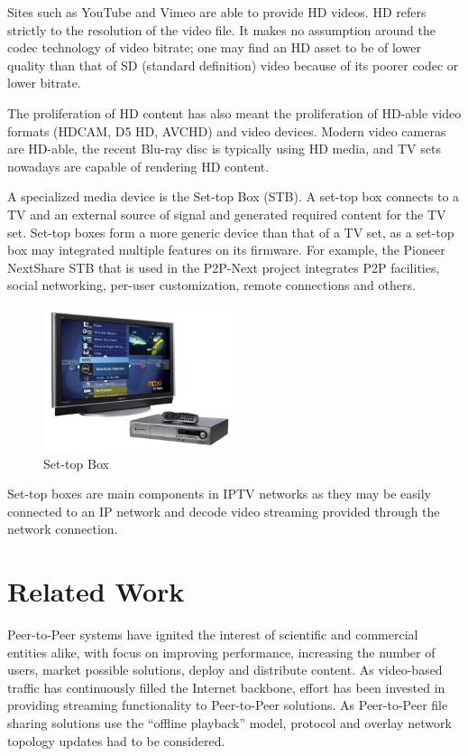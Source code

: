 Sites such as YouTube and Vimeo are able to provide HD videos. HD refers
strictly to the resolution of the video file. It makes no assumption around
the codec technology of video bitrate; one may find an HD asset to be of lower
quality than that of SD (standard definition) video because of its poorer
codec or lower bitrate.

The proliferation of HD content has also meant the proliferation of HD-able
video formats (HDCAM, D5 HD, AVCHD) and video devices. Modern video cameras
are HD-able, the recent Blu-ray disc is typically using HD media, and TV sets
nowadays are capable of rendering HD content.

A specialized media device is the Set-top Box (STB). A set-top box connects to
a TV and an external source of signal and generated required content for the
TV set. Set-top boxes form a more generic device than that of a TV set, as a
set-top box may integrated multiple features on its firmware. For example, the
Pioneer NextShare STB that is used in the P2P-Next project integrates P2P
facilities, social networking, per-user customization, remote connections and
others.

\begin{figure}
  \centering
  \includegraphics[width=0.5\textwidth]{src/img/multimedia-dist/stb}
  \caption{Set-top Box}
  \label{fig:multimedia-dist:stb}
\end{figure}

Set-top boxes are main components in IPTV networks as they may be easily
connected to an IP network and decode video streaming provided through the
network connection.

\section{Related Work}

Peer-to-Peer systems have ignited the interest of scientific and commercial
entities alike, with focus on improving performance, increasing the number of
users, market possible solutions, deploy and distribute content. As
video-based traffic has continuously filled the Internet backbone, effort has
been invested in providing streaming functionality to Peer-to-Peer solutions.
As Peer-to-Peer file sharing solutions use the ``offline playback'' model,
protocol and overlay network topology updates had to be considered.

